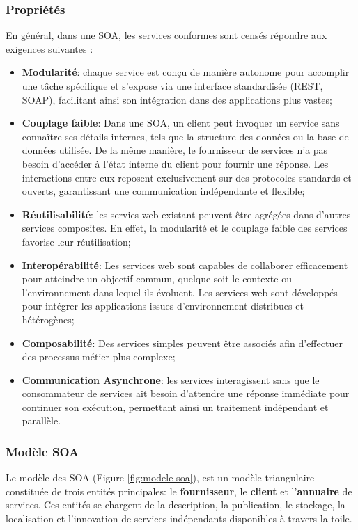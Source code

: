 \subsubsection{Propriétés}
En général, dans une SOA, les services conformes sont censés répondre aux exigences suivantes \cite{papazoglou2003service,kreger2001web,papazoglou2007service,dragoni2017microservices}:
\begin{itemize}
    \item \textbf{Modularité}: chaque service est conçu de manière autonome pour accomplir une tâche spécifique et s'expose via une interface standardisée (REST, SOAP), facilitant ainsi son intégration dans des applications plus vastes;
    \item \textbf{Couplage faible}: Dans une SOA, un client peut invoquer un service sans connaître ses détails internes, tels que la structure des données ou la base de données utilisée. De la même manière, le fournisseur de services n’a pas besoin d’accéder à l’état interne du client pour fournir une réponse. Les interactions entre eux reposent exclusivement sur des protocoles standards et ouverts, garantissant une communication indépendante et flexible;
    \item \textbf{Réutilisabilité}: les servies web existant peuvent être agrégées dans d'autres services composites. En effet, la modularité et le couplage faible des services favorise leur réutilisation; 
    \item \textbf{Interopérabilité}: Les services web sont capables de collaborer efficacement pour atteindre un objectif commun, quelque soit le contexte ou l'environnement dans lequel ils évoluent. Les services web sont développés pour intégrer les applications issues d'environnement distribues et hétérogènes;  
    \item \textbf{Composabilité}: Des services simples peuvent être associés afin d'effectuer des processus métier plus complexe;
    \item \textbf{Communication Asynchrone}: les services interagissent sans que le consommateur de services ait besoin d’attendre une réponse immédiate pour continuer son exécution, permettant ainsi un traitement indépendant et parallèle.
\end{itemize}

\subsubsection{Modèle SOA}
Le modèle des SOA (Figure \ref{fig:modele-soa}), est un modèle triangulaire constituée de trois entités principales: le \textbf{fournisseur}, le \textbf{client} et l'\textbf{annuaire} de services. Ces entités se chargent de la description, la publication, le stockage, la localisation et l'innovation de services indépendants disponibles à travers la toile.  

